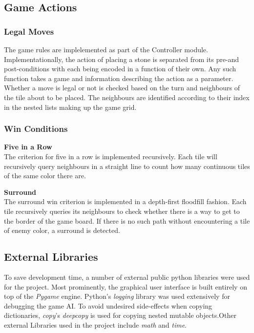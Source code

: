 \subsection{Game Actions}

\subsubsection{Legal Moves}
The game rules are implelemented as part of the Controller module. Implementationally, the action of placing a stone is separated from its pre-and post-conditions with each being encoded in a function of their own. Any such function takes a game and information describing the action as a parameter. 
Whether a move is legal or not is checked based on the turn and neighbours of the tile about to be placed. The neighbours are identified according to their index in the nested lists making up the game grid.


\subsubsection{Win Conditions}

\textbf{Five in a Row}\\
The criterion for five in a row is implemented recursively. Each tile will recursively query neighbours in a straight line to count how many continuous tiles of the same color there are.

\textbf{Surround}\\
The surround win criterion is implemented in a depth-first floodfill fashion. Each tile recursively queries its neighbours to check whether there is a way to get to the border of the game board. If there is no such path without encountering a tile of enemy color, a surround is detected.


\subsection{External Libraries}
To save development time, a number of external public python libraries were used for the project. Most prominently, the graphical user interface is built entirely on top of the \textit{Pygame} engine. Python's \textit{logging} library was used extensively for debugging the game AI. To avoid undesired side-effects when copying dictionaries, \textit{copy}'s \textit{deepcopy} is used for copying nested mutable objects.Other external Libraries used in the project include \textit{math} and \textit{time}.